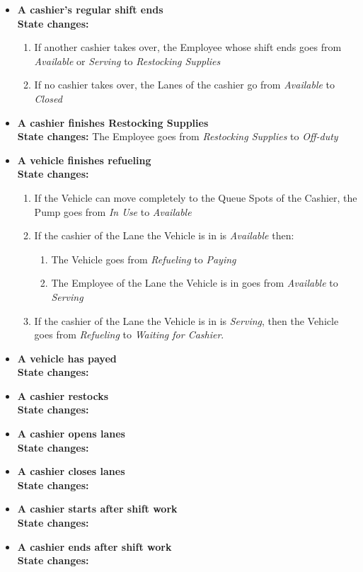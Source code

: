 \begin{itemize}
\begin{enumerate}
\end{enumerate}
\item \textbf{A cashier's regular shift ends}\\
\textbf{State changes:}
\begin{enumerate}
\item If another cashier takes over, the Employee whose shift ends goes from \textit{Available} or \textit{Serving} to \textit{Restocking Supplies}
\item If no cashier takes over, the Lanes of the cashier go from \textit{Available} to \textit{Closed}
\end{enumerate}
\item \textbf{A cashier finishes Restocking Supplies}\\
\textbf{State changes:}
The Employee goes from \textit{Restocking Supplies} to \textit{Off-duty}
\item \textbf{A vehicle finishes refueling}\\
\textbf{State changes:}
\begin{enumerate}
\item If the Vehicle can move completely to the Queue Spots of the Cashier, the Pump goes from \textit{In Use} to \textit{Available}
\item If the cashier of the Lane the Vehicle is in is \textit{Available} then:
\begin{enumerate}
\item The Vehicle goes from \textit{Refueling} to \textit{Paying}
\item The Employee of the Lane the Vehicle is in goes from \textit{Available} to \textit{Serving}
\end{enumerate}
\item If the cashier of the Lane the Vehicle is in is \textit{Serving}, then the Vehicle goes from \textit{Refueling} to \textit{Waiting for Cashier}.
\end{enumerate}
\item \textbf{A vehicle has payed}\\
\textbf{State changes:}
\item \textbf{A cashier restocks}\\
\textbf{State changes:}
\item \textbf{A cashier opens lanes}\\
\textbf{State changes:}
\item \textbf{A cashier closes lanes}\\
\textbf{State changes:}
\item \textbf{A cashier starts after shift work}\\
\textbf{State changes:}
\item \textbf{A cashier ends after shift work}\\
\textbf{State changes:}
\end{itemize}
